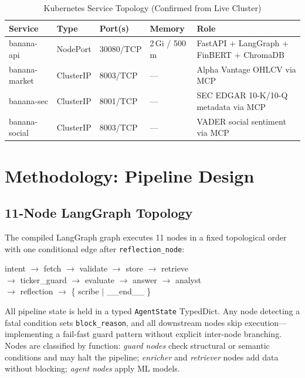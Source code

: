 \documentclass[10pt,journal,compsoc]{IEEEtran}
\newcommand{\node}[1]{\texttt{#1}}
\begin{document}
\begin{table}[htbp]
\caption{Kubernetes Service Topology (Confirmed from Live Cluster)}
\label{tab:k8s}
\centering
\small
\begin{tabular}{@{}p{3cm} p{2cm} p{2cm} p{2cm} p{5cm}@{}}
\toprule
\textbf{Service} & \textbf{Type} & \textbf{Port(s)} &
\textbf{Memory} & \textbf{Role} \\
\midrule
banana-api    & NodePort  & 30080/TCP & 2\,Gi / 500\,m & FastAPI + LangGraph + FinBERT + ChromaDB \\
banana-market & ClusterIP & 8003/TCP  & ---            & Alpha Vantage OHLCV via MCP \\
banana-sec    & ClusterIP & 8001/TCP  & ---            & SEC EDGAR 10-K/10-Q metadata via MCP \\
banana-social & ClusterIP & 8003/TCP  & ---            & VADER social sentiment via MCP \\
\bottomrule
\end{tabular}
\end{table}

\section{Methodology: Pipeline Design}
\label{sec:method}

\subsection{11-Node LangGraph Topology}

The compiled LangGraph graph executes 11 nodes in a fixed topological
order with one conditional edge after \node{reflection\_node}:

\begin{mdframed}[backgroundcolor=codebg,linecolor=navyblue,
                 linewidth=0.5pt,topline=false,bottomline=false,
                 leftline=true,rightline=false,innerleftmargin=6pt]
\ttfamily\footnotesize\noindent
intent $\!\to\!$ fetch $\!\to\!$ validate $\!\to\!$ store
$\!\to\!$ retrieve\\
$\to$ ticker\_guard $\!\to\!$ evaluate $\!\to\!$ answer
$\!\to\!$ analyst\\
$\to$ reflection $\!\to\!$ \{ scribe $|$ \_\_end\_\_ \}
\end{mdframed}

\vspace{4pt}

All pipeline state is held in a typed \texttt{AgentState} TypedDict.
Any node detecting a fatal condition sets \texttt{block\_reason}, and
all downstream nodes skip execution---implementing a fail-fast guard
pattern without explicit inter-node branching.
Nodes are classified by function: \emph{guard nodes} check structural
or semantic conditions and may halt the pipeline; \emph{enricher} and
\emph{retriever} nodes add data without blocking; \emph{agent nodes}
apply ML models.
\end{document}
